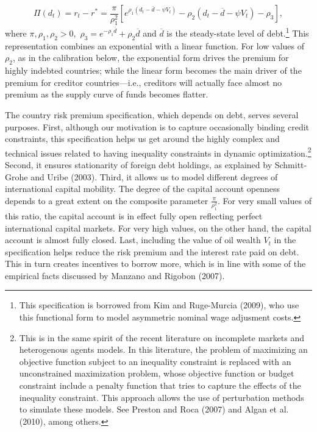 \documentclass[11pt]{article}
\begin{document}
\begin{equation}
\Pi (d_{t})=r_{t}-r^{\ast }=\frac{\pi }{\rho _{1}^{2}}\left[ e^{\rho
_{1}(d_{t}-\bar{d}-\psi V_{t})}-\rho _{2}(d_{t}-\overline{d}-\psi
V_{t})-\rho _{3}\right] ,  \label{5}
\end{equation}%
where $\pi ,\rho _{1},\rho _{2}>0,$ $\rho _{3}=e^{-\rho _{1}\overline{d}%
}+\rho _{2}\overline{d}$ and $\overline{d}$ is the steady-state level of
debt.\footnote{%
This specification is borrowed from Kim and Ruge-Murcia (2009), who use this
functional form to model asymmetric nominal wage adjusment costs.} This
representation combines an exponential with a linear function. For low
values of $\rho _{2}$, as in the calibration below, the exponential form
drives the premium for highly indebted countries; while the linear form
becomes the main driver of the premium for creditor countries---i.e.,
creditors will actually face almost no premium as the supply curve of funds
becomes flatter.

The country risk premium specification, which depends on debt, serves
several purposes. First, although our motivation is to capture occasionally
binding credit constraints, this specification helps us get around the
highly complex and technical issues related to having inequality constraints
in dynamic optimization.\footnote{%
This is in the same spirit of the recent literature on incomplete markets
and heterogenous agents models. In this literature, the problem of
maximizing an objective function subject to an inequality constraint is
replaced with an unconstrained maximization problem, whose objective
function or budget constraint include a penalty function that tries to
capture the effects of the inequality constraint. This approach allows the
use of perturbation methods to simulate these models. See Preston and Roca
(2007) and Algan et al. (2010), among others.} Second, it ensures
stationarity of foreign debt holdings, as explained by Schmitt-Grohe and
Uribe (2003). Third, it allows us to model different degrees of
international capital mobility. The degree of the capital account openness
depends to a great extent on the composite parameter $\frac{\pi }{\rho
_{1}^{2}}.$ For very small values of this ratio, the capital account is in
effect fully open reflecting perfect international capital markets. For very
high values, on the other hand, the capital account is almost fully closed.
Last, including the value of oil wealth $V_{t}$ in the specification helps
reduce the risk premium and the interest rate paid on debt. This in turn
creates incentives to borrow more, which is in line with some of the
empirical facts discussed by Manzano and Rigobon (2007).
\end{document}
